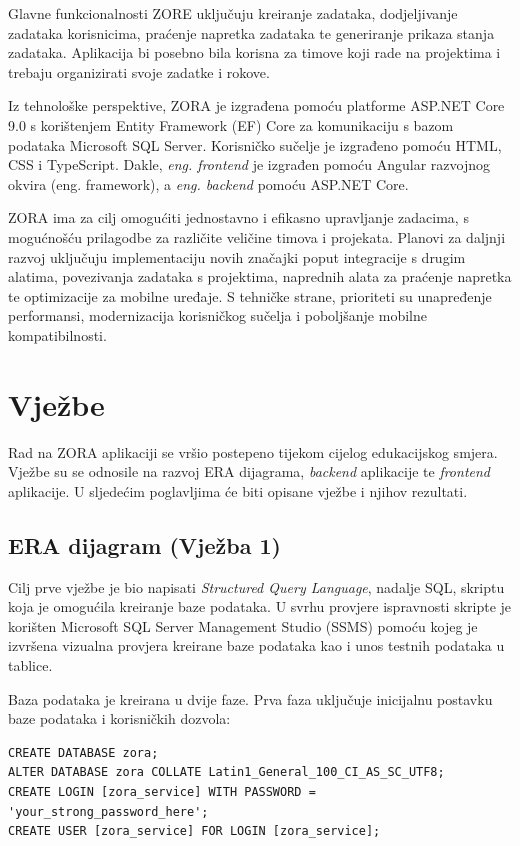 \documentclass[a4paper,12pt]{article}
\begin{document}
Glavne funkcionalnosti ZORE uključuju kreiranje zadataka, dodjeljivanje zadataka korisnicima, praćenje napretka zadataka te generiranje prikaza stanja zadataka. Aplikacija bi posebno bila korisna za timove koji rade na projektima i trebaju organizirati svoje zadatke i rokove.

Iz tehnološke perspektive, ZORA je izgrađena pomoću platforme ASP.NET Core 9.0 s korištenjem Entity Framework (EF) Core za komunikaciju s bazom podataka Microsoft SQL Server. Korisničko sučelje je izgrađeno pomoću HTML, CSS i TypeScript. Dakle, \emph{eng. frontend} je izgrađen pomoću Angular razvojnog okvira (eng. framework), a \emph{eng. backend} pomoću ASP.NET Core.

ZORA ima za cilj omogućiti jednostavno i efikasno upravljanje zadacima, s mogućnošću prilagodbe za različite veličine timova i projekata. Planovi za daljnji razvoj uključuju implementaciju novih značajki poput integracije s drugim alatima, povezivanja zadataka s projektima, naprednih alata za praćenje napretka te optimizacije za mobilne uređaje. S tehničke strane, prioriteti su unapređenje performansi, modernizacija korisničkog sučelja i poboljšanje mobilne kompatibilnosti.

\section{Vježbe}

Rad na ZORA aplikaciji se vršio postepeno tijekom cijelog edukacijskog smjera. Vježbe su se odnosile na razvoj ERA dijagrama, \emph{backend} aplikacije te \emph{frontend} aplikacije. U sljedećim poglavljima će biti opisane vježbe i njihov rezultati.

\subsection{ERA dijagram (Vježba 1)}

Cilj prve vježbe je bio napisati \emph{Structured Query Language}, nadalje SQL, skriptu koja je omogućila kreiranje baze podataka. U svrhu provjere ispravnosti skripte je korišten Microsoft SQL Server Management Studio (SSMS) pomoću kojeg je izvršena vizualna provjera kreirane baze podataka kao i unos testnih podataka u tablice.

Baza podataka je kreirana u dvije faze. Prva faza uključuje inicijalnu postavku baze podataka i korisničkih dozvola:

\begin{lstlisting}[style=sqlstyle]
CREATE DATABASE zora;
ALTER DATABASE zora COLLATE Latin1_General_100_CI_AS_SC_UTF8;
CREATE LOGIN [zora_service] WITH PASSWORD = 'your_strong_password_here';
CREATE USER [zora_service] FOR LOGIN [zora_service];
\end{lstlisting}
\end{document}
